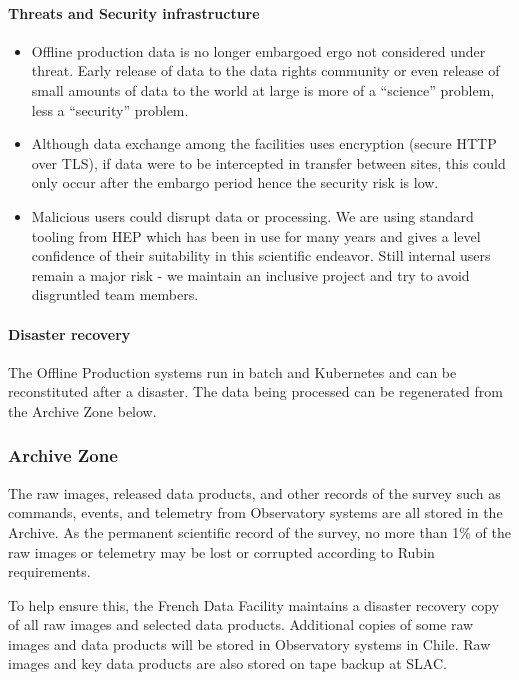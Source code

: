 \paragraph{ Threats and Security infrastructure}
\begin{itemize}
\item Offline production data is no longer embargoed ergo not considered under threat.  Early release of data to the data rights community or even release of small amounts of data to the world at large is more of a ``science'' problem, less a ``security'' problem.
\item Although data exchange among the facilities uses encryption (secure HTTP over \gls{TLS}), if data were to be intercepted in transfer between sites, this could only occur after the embargo period hence the security risk is low.
\item Malicious users could disrupt data or processing.
We are using standard tooling from \gls{HEP} which has been in use for many years and gives a level confidence of their suitability in this scientific endeavor.
Still internal users remain a major risk - we maintain an inclusive project and try to avoid disgruntled team members.
\end{itemize}
\paragraph{Disaster recovery}
The Offline Production systems run in batch and \gls{Kubernetes} and can be reconstituted after a disaster.
The data being processed can be regenerated from the \gls{Archive} Zone below.


\subsubsection{ \gls{Archive} Zone}
The raw images, released data products, and other records of the survey such as commands, events, and telemetry from Observatory systems are all stored in the \gls{Archive}.
As the permanent scientific record of the survey, no more than 1\% of the raw images or telemetry may be lost or corrupted according to Rubin requirements.

To help ensure this, the French Data Facility maintains a disaster recovery copy of all raw images and selected data products. Additional copies of some raw images and data products will be stored in Observatory systems in Chile.  Raw images and key data products are also stored on tape backup at \gls{SLAC}.

